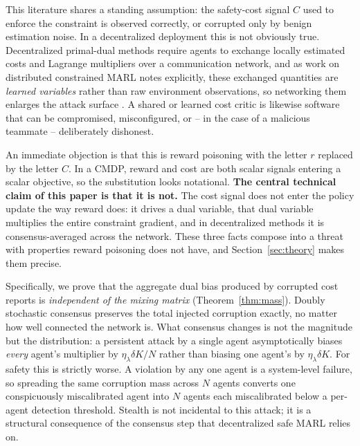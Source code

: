\documentclass{article}
\begin{document}
This literature shares a standing assumption: the safety-cost signal $C$ used to enforce the constraint is observed correctly, or corrupted only by benign estimation noise. In a decentralized deployment this is not obviously true. Decentralized primal-dual methods require agents to exchange locally estimated costs and Lagrange multipliers over a communication network, and as work on distributed constrained MARL notes explicitly, these exchanged quantities are \emph{learned variables} rather than raw environment observations, so networking them enlarges the attack surface \citep{kahe2024distributed}. A shared or learned cost critic is likewise software that can be compromised, misconfigured, or -- in the case of a malicious teammate -- deliberately dishonest.

An immediate objection is that this is reward poisoning \citep{zhang2020adaptive,rakhsha2020policyteaching,wang2024rlhfpoison} with the letter $r$ replaced by the letter $C$. In a CMDP, reward and cost are both scalar signals entering a scalar objective, so the substitution looks notational. \textbf{The central technical claim of this paper is that it is not.} The cost signal does not enter the policy update the way reward does: it drives a dual variable, that dual variable multiplies the entire constraint gradient, and in decentralized methods it is consensus-averaged across the network. These three facts compose into a threat with properties reward poisoning does not have, and Section~\ref{sec:theory} makes them precise.

Specifically, we prove that the aggregate dual bias produced by corrupted cost reports is \emph{independent of the mixing matrix} (Theorem~\ref{thm:mass}). Doubly stochastic consensus preserves the total injected corruption exactly, no matter how well connected the network is. What consensus changes is not the magnitude but the distribution: a persistent attack by a single agent asymptotically biases \emph{every} agent's multiplier by $\eta_\lambda\delta K/N$ rather than biasing one agent's by $\eta_\lambda\delta K$. For safety this is strictly worse. A violation by any one agent is a system-level failure, so spreading the same corruption mass across $N$ agents converts one conspicuously miscalibrated agent into $N$ agents each miscalibrated below a per-agent detection threshold. Stealth is not incidental to this attack; it is a structural consequence of the consensus step that decentralized safe MARL relies on.
\end{document}
